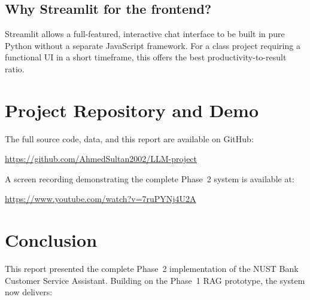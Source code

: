 \documentclass[12pt,a4paper]{article}
\begin{document}
\subsection{Why Streamlit for the frontend?}

Streamlit allows a full-featured, interactive chat interface to be built in pure
Python without a separate JavaScript framework.  For a class project requiring a
functional UI in a short timeframe, this offers the best productivity-to-result
ratio.

\section{Project Repository and Demo}

The full source code, data, and this report are available on GitHub:

\begin{center}
  \url{https://github.com/AhmedSultan2002/LLM-project}
\end{center}

A screen recording demonstrating the complete Phase~2 system is available at:

\begin{center}
  \url{https://www.youtube.com/watch?v=7ruPYNj4U2A}
\end{center}

\section{Conclusion}

This report presented the complete Phase~2 implementation of the NUST Bank
Customer Service Assistant.  Building on the Phase~1 RAG prototype, the system
now delivers:
\end{document}
